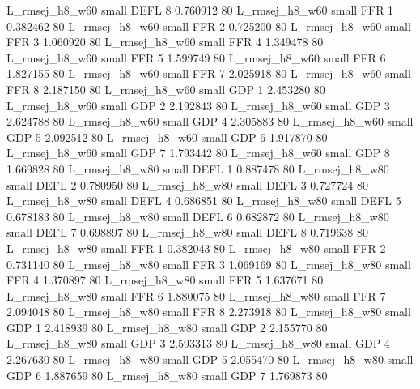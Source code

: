 L_rmsej_h8_w60      small     DEFL                 8 0.760912 80
L_rmsej_h8_w60      small      FFR                 1 0.382462 80
L_rmsej_h8_w60      small      FFR                 2 0.725200 80
L_rmsej_h8_w60      small      FFR                 3 1.060920 80
L_rmsej_h8_w60      small      FFR                 4 1.349478 80
L_rmsej_h8_w60      small      FFR                 5 1.599749 80
L_rmsej_h8_w60      small      FFR                 6 1.827155 80
L_rmsej_h8_w60      small      FFR                 7 2.025918 80
L_rmsej_h8_w60      small      FFR                 8 2.187150 80
L_rmsej_h8_w60      small      GDP                 1 2.453280 80
L_rmsej_h8_w60      small      GDP                 2 2.192843 80
L_rmsej_h8_w60      small      GDP                 3 2.624788 80
L_rmsej_h8_w60      small      GDP                 4 2.305883 80
L_rmsej_h8_w60      small      GDP                 5 2.092512 80
L_rmsej_h8_w60      small      GDP                 6 1.917870 80
L_rmsej_h8_w60      small      GDP                 7 1.793442 80
L_rmsej_h8_w60      small      GDP                 8 1.669828 80
L_rmsej_h8_w80      small     DEFL                 1 0.887478 80
L_rmsej_h8_w80      small     DEFL                 2 0.780950 80
L_rmsej_h8_w80      small     DEFL                 3 0.727724 80
L_rmsej_h8_w80      small     DEFL                 4 0.686851 80
L_rmsej_h8_w80      small     DEFL                 5 0.678183 80
L_rmsej_h8_w80      small     DEFL                 6 0.682872 80
L_rmsej_h8_w80      small     DEFL                 7 0.698897 80
L_rmsej_h8_w80      small     DEFL                 8 0.719638 80
L_rmsej_h8_w80      small      FFR                 1 0.382043 80
L_rmsej_h8_w80      small      FFR                 2 0.731140 80
L_rmsej_h8_w80      small      FFR                 3 1.069169 80
L_rmsej_h8_w80      small      FFR                 4 1.370897 80
L_rmsej_h8_w80      small      FFR                 5 1.637671 80
L_rmsej_h8_w80      small      FFR                 6 1.880075 80
L_rmsej_h8_w80      small      FFR                 7 2.094048 80
L_rmsej_h8_w80      small      FFR                 8 2.273918 80
L_rmsej_h8_w80      small      GDP                 1 2.418939 80
L_rmsej_h8_w80      small      GDP                 2 2.155770 80
L_rmsej_h8_w80      small      GDP                 3 2.593313 80
L_rmsej_h8_w80      small      GDP                 4 2.267630 80
L_rmsej_h8_w80      small      GDP                 5 2.055470 80
L_rmsej_h8_w80      small      GDP                 6 1.887659 80
L_rmsej_h8_w80      small      GDP                 7 1.769873 80
